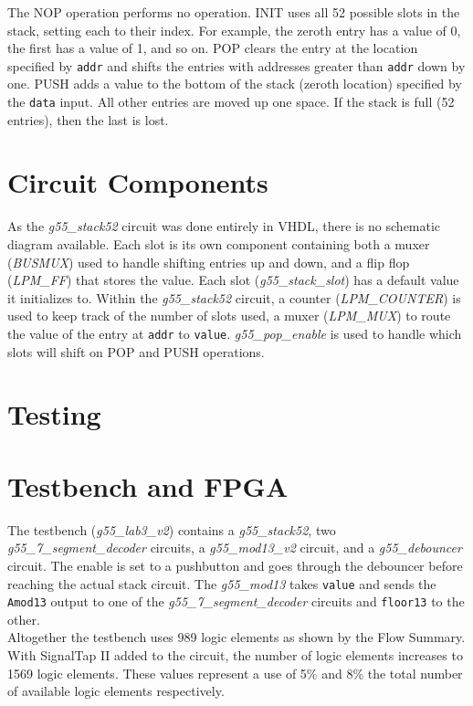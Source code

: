 \documentclass[12pt]{article}
\begin{document}
The NOP operation performs no operation. INIT uses all 52 possible slots in the stack, setting each to their index. For example, the zeroth entry has a value of 0, the first has a value of 1, and so on. POP clears the entry at the location specified by \texttt{addr} and shifts the entries with addresses greater than \texttt{addr} down by one. PUSH adds a value to the bottom of the stack (zeroth location) specified by the \texttt{data} input. All other entries are moved up one space. If the stack is full (52 entries), then the last is lost.\\

\section{Circuit Components}
As the \textit{g55\_stack52} circuit was done entirely in VHDL, there is no schematic diagram available. Each slot is its own component containing both a muxer (\textit{BUSMUX}) used to handle shifting entries up and down, and a flip flop (\textit{LPM\_FF}) that stores the value. Each slot (\textit{g55\_stack\_slot}) has a default value it initializes to. Within the \textit{g55\_stack52} circuit, a counter (\textit{LPM\_COUNTER}) is used to keep track of the number of slots used, a muxer (\textit{LPM\_MUX}) to route the value of the entry at \texttt{addr} to \texttt{value}. \textit{g55\_pop\_enable} is used to handle which slots will shift on POP and PUSH operations.\\

\section{Testing}

\section{Testbench and FPGA}
The testbench (\textit{g55\_lab3\_v2}) contains a \textit{g55\_stack52}, two \textit{g55\_7\_segment\_decoder} circuits, a \textit{g55\_mod13\_v2} circuit, and a \textit{g55\_debouncer} circuit. The enable is set to a pushbutton and goes through the debouncer before reaching the actual stack circuit. The \textit{g55\_mod13} takes \texttt{value} and sends the \texttt{Amod13} output to one of the \textit{g55\_7\_segment\_decoder} circuits and \texttt{floor13} to the other.\\

Altogether the testbench uses 989 logic elements as shown by the Flow Summary. With SignalTap II added to the circuit, the number of logic elements increases to 1569 logic elements. These values represent a use of 5\% and 8\% the total number of available logic elements respectively.
\end{document}
